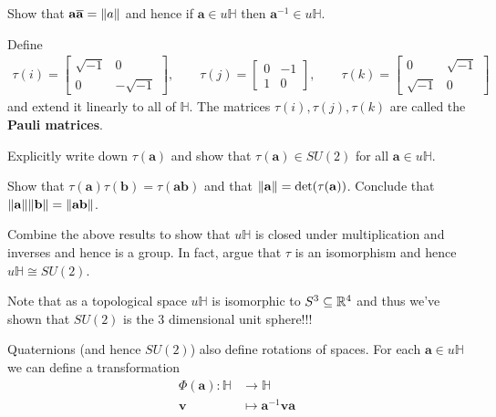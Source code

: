 \begin{question}
	Show that $\mathbf{a} \overline{\mathbf{a}} = \lVert a \rVert$ and hence if $\mathbf{a} \in u \mathbb{H}$ then $\mathbf{a}^{-1} \in u \mathbb{H}$.
\end{question}
Define
\begin{align*}
	\tau (i) = \begin{bmatrix}
	\sqrt{-1} & 0 \\
	0 & -\sqrt{-1}
\end{bmatrix}, \qquad
\tau (j) = \begin{bmatrix}
0 & -1 \\
1 & 0
\end{bmatrix}, \qquad
\tau (k) = \begin{bmatrix}
0 & \sqrt{-1} \\
\sqrt{-1} & 0
\end{bmatrix}
\end{align*}
and extend it linearly to all of $\mathbb{H}$. The matrices $\tau(i), \tau(j), \tau(k)$ are called the \textbf{Pauli matrices}.
\begin{question}
	Explicitly write down $\tau(\mathbf{a})$ and show that $\tau(\mathbf{a}) \in SU(2)$ for all $\mathbf{a} \in u\mathbb{H}$.
\end{question}
\begin{question}
	Show that $\tau(\mathbf{a}) \tau(\mathbf{b}) = \tau(\mathbf{a} \mathbf{b})$ and that $\lVert \mathbf{a} \rVert = \det (\tau (\mathbf{a}))$. Conclude that $\lVert \mathbf{a} \rVert \lVert \mathbf{b} \rVert = \lVert \mathbf{a} \mathbf{b} \rVert$.
\end{question}

\begin{question}
	Combine the above results to show that $u \mathbb{H}$ is closed under multiplication and inverses and hence is a group. In fact, argue that $\tau$ is an isomorphism and hence $u \mathbb{H} \cong SU(2)$.
\end{question}
\begin{remark}
	Note that as a topological space $u \mathbb{H}$ is isomorphic to $S^3 \subseteq \mathbb{R}^4$ and thus we've shown that $SU(2)$ is the 3 dimensional unit sphere!!!
\end{remark}

Quaternions (and hence $SU(2)$) also define rotations of spaces. For each $\mathbf{a} \in u \mathbb{H}$ we can define a transformation \begin{align*}
	\Phi(\mathbf{a}): \mathbb{H} &\rightarrow \mathbb{H} \\
	\mathbf{v} &\mapsto \mathbf{a}^{-1} \mathbf{v} \mathbf{a}
\end{align*}

